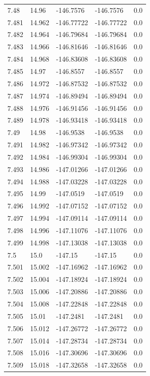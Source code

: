 \begin{tabular}{lllll}
7.48 & 14.96 & -146.7576 & -146.7576 & 0.0 \\
7.481 & 14.962 & -146.77722 & -146.77722 & 0.0 \\
7.482 & 14.964 & -146.79684 & -146.79684 & 0.0 \\
7.483 & 14.966 & -146.81646 & -146.81646 & 0.0 \\
7.484 & 14.968 & -146.83608 & -146.83608 & 0.0 \\
7.485 & 14.97 & -146.8557 & -146.8557 & 0.0 \\
7.486 & 14.972 & -146.87532 & -146.87532 & 0.0 \\
7.487 & 14.974 & -146.89494 & -146.89494 & 0.0 \\
7.488 & 14.976 & -146.91456 & -146.91456 & 0.0 \\
7.489 & 14.978 & -146.93418 & -146.93418 & 0.0 \\
7.49 & 14.98 & -146.9538 & -146.9538 & 0.0 \\
7.491 & 14.982 & -146.97342 & -146.97342 & 0.0 \\
7.492 & 14.984 & -146.99304 & -146.99304 & 0.0 \\
7.493 & 14.986 & -147.01266 & -147.01266 & 0.0 \\
7.494 & 14.988 & -147.03228 & -147.03228 & 0.0 \\
7.495 & 14.99 & -147.0519 & -147.0519 & 0.0 \\
7.496 & 14.992 & -147.07152 & -147.07152 & 0.0 \\
7.497 & 14.994 & -147.09114 & -147.09114 & 0.0 \\
7.498 & 14.996 & -147.11076 & -147.11076 & 0.0 \\
7.499 & 14.998 & -147.13038 & -147.13038 & 0.0 \\
7.5 & 15.0 & -147.15 & -147.15 & 0.0 \\
7.501 & 15.002 & -147.16962 & -147.16962 & 0.0 \\
7.502 & 15.004 & -147.18924 & -147.18924 & 0.0 \\
7.503 & 15.006 & -147.20886 & -147.20886 & 0.0 \\
7.504 & 15.008 & -147.22848 & -147.22848 & 0.0 \\
7.505 & 15.01 & -147.2481 & -147.2481 & 0.0 \\
7.506 & 15.012 & -147.26772 & -147.26772 & 0.0 \\
7.507 & 15.014 & -147.28734 & -147.28734 & 0.0 \\
7.508 & 15.016 & -147.30696 & -147.30696 & 0.0 \\
7.509 & 15.018 & -147.32658 & -147.32658 & 0.0 \\

\end{tabular}
